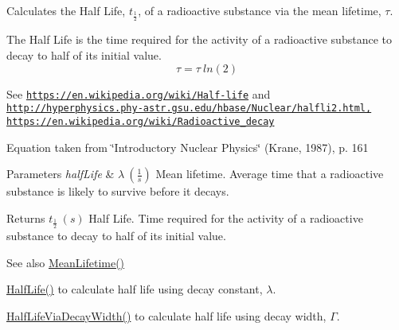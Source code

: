 Calculates the Half Life, $t_{\frac{1}{2}}$, of a radioactive substance via the mean lifetime, $\tau$. 

The Half Life is the time required for the activity of a radioactive substance to decay to half of its initial value. \[\tau= \tau \ ln(2)\]

See \href{https://en.wikipedia.org/wiki/Half-life}{\tt https\+://en.\+wikipedia.\+org/wiki/\+Half-\/life} and \href{http://hyperphysics.phy-astr.gsu.edu/hbase/Nuclear/halfli2.html,}{\tt http\+://hyperphysics.\+phy-\/astr.\+gsu.\+edu/hbase/\+Nuclear/halfli2.\+html,} \href{https://en.wikipedia.org/wiki/Radioactive_decay}{\tt https\+://en.\+wikipedia.\+org/wiki/\+Radioactive\+\_\+decay}

Equation taken from \char`\"{}\+Introductory Nuclear Physics\char`\"{} (Krane, 1987), p. 161


\begin{DoxyParams}{Parameters}
{\em half\+Life} & $\lambda\ (\frac{1}{s})$ Mean lifetime. Average time that a radioactive substance is likely to survive before it decays. \\
\hline
\end{DoxyParams}
\begin{DoxyReturn}{Returns}
$t_{\frac{1}{2}}\ (s)$ Half Life. Time required for the activity of a radioactive substance to decay to half of its initial value. 
\end{DoxyReturn}
\begin{DoxySeeAlso}{See also}
\mbox{\hyperlink{group___e_g_x_phys-_mean_lifetime_gaa9e3c2deedda4bc7a745568b06fc47eb}{Mean\+Lifetime()}} 

\mbox{\hyperlink{group___e_g_x_phys-_half_life_ga21d268f154fb91c1c556bbfa7fe83ac1}{Half\+Life()}} to calculate half life using decay constant, $\lambda$. 

\mbox{\hyperlink{group___e_g_x_phys-_half_life_gaba3fda944d1a68ee1016a1f2f5809359}{Half\+Life\+Via\+Decay\+Width()}} to calculate half life using decay width, $\Gamma$. 
\end{DoxySeeAlso}
